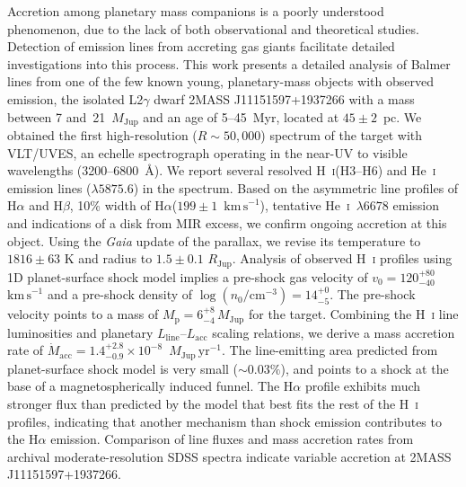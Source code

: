 \documentclass{aa}
\newcommand{\mj}{\ensuremath{M_\mathrm{Jup}}\xspace}
\newcommand{\rj}{\ensuremath{R_\mathrm{Jup}}\xspace}
\newcommand{\mjyr}{\ensuremath{M_\mathrm{Jup}\,\mathrm{yr^{-1}}}\xspace}
\newcommand{\Mp}{\ensuremath{M_{\mathrm{p}}}\xspace}
\newcommand{\Ha}{\ensuremath{\mathrm{H}\alpha}\xspace}
\newcommand{\Hb}{\ensuremath{\mathrm{H}\beta}\xspace}
\newcommand{\Lacc}{\ensuremath{L_{\mathrm{acc}}}\xspace}
\newcommand{\mdot}{\ensuremath{\dot{M}_{\mathrm{acc}}}\xspace}
\newcommand{\Lline}{\ensuremath{L_{\mathrm{line}}}\xspace}
\newcommand{\Hi}{H~\textsc{i}\xspace}
\newcommand{\Hei}{He~\textsc{i}\xspace}
\newcommand{\kms}{\ensuremath{\mathrm{km\,s}^{-1}}\xspace}
\begin{document}
  \abstract
  {Accretion among planetary mass companions is a poorly understood phenomenon, due to the lack of both observational and theoretical studies. Detection of emission lines from accreting gas giants facilitate detailed investigations into this process.}
  {This work presents a detailed analysis of Balmer lines from one of the few known young, planetary-mass objects with observed emission, the isolated L2$\gamma$ dwarf 2MASS J11151597+1937266 with a mass between 7 and~21~\mj and an age of 5--45~Myr, located at $45\pm2$~pc.}
  {We obtained the first high-resolution ($R\sim50,000$) spectrum of the target with VLT/UVES, an echelle spectrograph operating in the near-UV to visible wavelengths (3200--6800~\AA).}
  {We report several resolved \Hi (H3--H6) and \Hei emission lines ($\lambda5875.6$) in the spectrum. Based on the asymmetric line profiles of \Ha and \Hb, 10\% width of \Ha ($199\pm1$~\kms), tentative \Hei~$\lambda6678$ emission and indications of a disk from MIR excess, we confirm ongoing accretion at this object. Using the \textit{Gaia} update of the parallax, we revise its temperature to $1816\pm63$ K and radius to $1.5\pm0.1$ \rj. Analysis of observed \Hi profiles using 1D planet-surface shock model implies a pre-shock gas velocity of $v_0=120^{+80}_{-40}$~\kms and a pre-shock density of $\log(n_0/\mathrm{cm}^{-3})=14^{+0}_{-5}$. The pre-shock velocity points to a mass of $\Mp=6^{+8}_{-4}\,\mj$ for the target. Combining the \Hi line luminosities and planetary \Lline--\Lacc scaling relations, we derive a mass accretion rate of \mdot$=1.4^{+2.8}_{-0.9}\times10^{-8}$~\mjyr.}
  {The line-emitting area predicted from planet-surface shock model is very small ($\sim0.03\%$), and points to a shock at the base of a magnetospherically induced funnel. The \Ha profile exhibits much stronger flux than predicted by the model that best fits the rest of the \Hi profiles, indicating that another mechanism than shock emission contributes to the \Ha emission. Comparison of line fluxes and mass accretion rates from archival moderate-resolution SDSS spectra indicate variable accretion at 2MASS J11151597+1937266.} 
  
\end{document}
